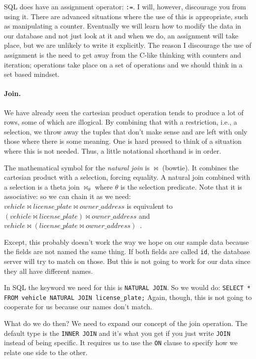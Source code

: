 SQL does have an assignment operator: \texttt{:=}. I will, however, discourage you from using it. There are advanced situations where the use of this is appropriate, such as manipulating a counter. Eventually we will learn how to modify the data in our database and not just look at it and when we do, an assignment will take place, but we are unlikely to write it explicitly. The reason I discourage the use of assignment is the need to get away from the C-like thinking with counters and iteration; operations take place on a set of operations and we should think in a set based mindset.

\paragraph{Join.} We have already seen the cartesian product operation tends to produce a lot of rows, some of which are illogical. By combining that with a restriction, i.e., a selection, we throw away the tuples that don't make sense and are left with only those where there is some meaning. One is hard pressed to think of a situation where this is not needed. Thus, a little notational shorthand is in order. 

The mathematical symbol for the \textit{natural join} is $\Join$ (bowtie). It combines the cartesian product with a selection, forcing equality. A natural join combined with a selection is a theta join $\Join_{\theta}$ where $\theta$ is the selection predicate. Note that it is associative: so we can chain it as we need: $vehicle \Join license\_plate \Join owner\_address$ is equivalent to  $(vehicle \Join license\_plate) \Join owner\_address$  and $vehicle \Join (license\_plate \Join owner\_address)$~\cite{dsc}. 

Except, this probably doesn't work the way we hope on our sample data because the fields are not named the same thing. If both fields are called \texttt{id}, the database server will try to match on those. But this is not going to work for our data since they all have different names. 

In SQL the keyword we need for this is \texttt{NATURAL JOIN}. So we would do: \texttt{SELECT * FROM vehicle NATURAL JOIN license\_plate;} Again, though, this is not going to cooperate for us because our names don't match.

What do we do then? We need to expand our concept of the join operation. The default type is the \texttt{INNER JOIN} and it's what you get if you just write \texttt{JOIN} instead of being specific. It requires us to use the \texttt{ON} clause to specify how we relate one side to the other.

